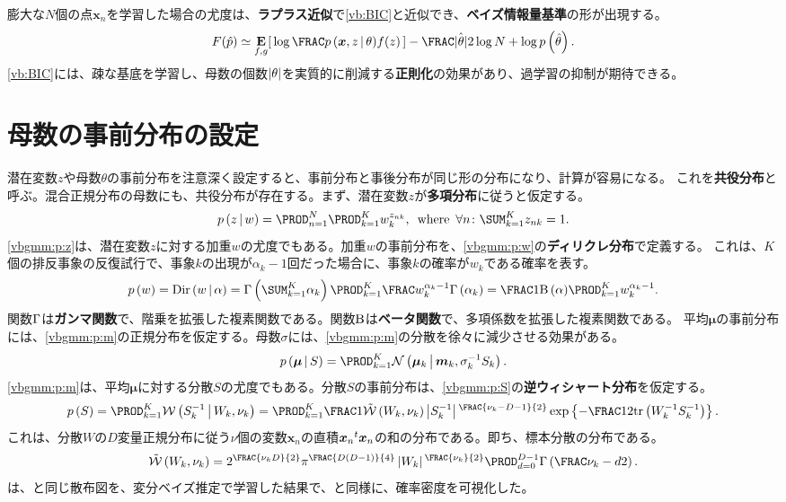 \documentclass[10pt,a4paper]{book}
\begin{document}
%
膨大な$N$個の点$\bm{x}_n$を学習した場合の尤度は、\textbf{ラプラス近似}で\eqref{vb:BIC}と近似でき、\textbf{ベイズ情報量基準}の形が出現する。
%
\begin{equation}
\label{eq:vb:BIC}
F(\hat{p}) \simeq
\E[f,g]{\log \frac{\prob{\bm{x},z}[\theta]}{f(z)}} - \frac{\hat{\abs{\theta}}}{2} \log N + \log \prob{\hat{\theta}}.
\end{equation}
%
\eqref{vb:BIC}には、疎な基底を学習し、母数の個数$\abs{\theta}$を実質的に削減する\textbf{正則化}の効果があり、過学習の抑制が期待できる。

\section{母数の事前分布の設定\label{sect:vbgmm}}

潜在変数$z$や母数$\theta$の事前分布を注意深く設定すると、事前分布と事後分布が同じ形の分布になり、計算が容易になる。
これを\textbf{共役分布}と呼ぶ。混合正規分布の母数にも、共役分布が存在する。まず、潜在変数$z$が\textbf{多項分布}に従うと仮定する。
%
\begin{equation}
\label{eq:vbgmm:p:z}
\prob{z}[w] = \prod_{n=1}^N \prod_{k=1}^K w_k^{z_{nk}},
\where
\forall n\colon
\sum_{k=1}^K z_{nk} = 1.
\end{equation}
%
\eqref{vbgmm:p:z}は、潜在変数$z$に対する加重$w$の尤度でもある。加重$w$の事前分布を、\eqref{vbgmm:p:w}の\textbf{ディリクレ分布}で定義する。
これは、$K$個の排反事象の反復試行で、事象$k$の出現が$\alpha_k-1$回だった場合に、事象$k$の確率が$w_k$である確率を表す。
%
\begin{equation}
\label{eq:vbgmm:p:w}
\prob{w} = \Dd{w}{\alpha} =
\Gd{\sum_{k=1}^K \alpha_k} \prod_{k=1}^K \frac{w_k^{\alpha_k-1}}{\Gd{\alpha_k}} =
\frac{1}{\Bd{\alpha}} \prod_{k=1}^K w_k^{\alpha_k-1}.
\end{equation}
%
関数$\Gamma$は\textbf{ガンマ関数}で、階乗を拡張した複素関数である。関数$\mathrm{B}$は\textbf{ベータ関数}で、多項係数を拡張した複素関数である。
平均$\bm{\mu}$の事前分布には、\eqref{vbgmm:p:m}の正規分布を仮定する。母数$\sigma$には、\eqref{vbgmm:p:m}の分散を徐々に減少させる効果がある。
%
\begin{equation}
\label{eq:vbgmm:p:m}
\prob{\bm{\mu}}[S] = \prod_{k=1}^K \Nd{\bm{\mu}_k}{\bm{m}_k,\sigma_k^{-1} S_k}.
\end{equation}
%
\eqref{vbgmm:p:m}は、平均$\bm{\mu}$に対する分散$S$の尤度でもある。分散$S$の事前分布は、\eqref{vbgmm:p:S}の\textbf{逆ウィシャート分布}を仮定する。
%
\begin{equation}
\label{eq:vbgmm:p:S}
\prob{S} =
\prod_{k=1}^K \Wd{S_k^{-1}}{W_k,\nu_k} =
\prod_{k=1}^K \frac{1}{\Wn{W_k,\nu_k}} \abs{S_k^{-1}}^{\FRAC{\nu_k-D-1}{2}} \exp\seq{-\frac{1}{2}\trace{W_k^{-1}S_k^{-1}}}.
\end{equation}
%
これは、分散$W$の$D$変量正規分布に従う$\nu$個の変数$\bm{x}_n$の直積$\bm{x}_n{}^t\bm{x}_n$の和の分布である。即ち、標本分散の分布である。
%
\begin{equation}
\Wn{W_k,\nu_k} = 2^{\FRAC{\nu_kD}{2}} \pi^{\FRAC{D(D-1)}{4}} \abs{W_k}^{\FRAC{\nu_k}{2}} \prod_{d=0}^{D-1} \Gd{\frac{\nu_k-d}{2}}.
\end{equation}
%
は、と同じ散布図を、変分ベイズ推定で学習した結果で、と同様に、確率密度を可視化した。
\end{document}

